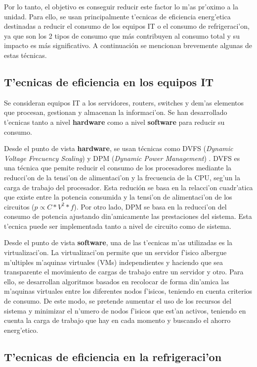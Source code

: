 	Por lo tanto, el objetivo es conseguir reducir este factor lo m'as pr'oximo a la unidad. Para ello, se usan principalmente t'ecnicas de eficiencia energ'etica destinadas a reducir el consumo de los equipos IT o el consumo de refrigeraci'on, ya que son los 2 tipos de consumo que más contribuyen al consumo total y su impacto es más significativo. A continuación se mencionan brevemente algunas de estas técnicas.

\subsection{T'ecnicas de eficiencia en los equipos IT}\label{sec:equiposIT}

	Se consideran equipos IT a los servidores, routers, switches y dem'as elementos que procesan, gestionan y almacenan la informaci'on. Se han desarrollado t'ecnicas tanto a nivel \textbf{hardware} como a nivel \textbf{software} \cite{ITEfficiency} para reducir su consumo. 

	Desde el punto de vista \textbf{hardware}, se usan técnicas como DVFS (\textit{Dynamic Voltage Frecuency Scaling}) \cite{DVFS} y DPM (\textit{Dynamic Power Management}) \cite{DPM}. DVFS es una técnica que pemite reducir el consumo de los procesadores mediante la reducci'on de la tensi'on de alimentaci'on y la frecuencia de la CPU, seg'un la carga de trabajo del procesador. Esta redución se basa en la relacci'on cuadr'atica que existe entre la potencia consumida y la tensi'on de alimentaci'on de los circuitos ($ p\propto C*V^{2}*f$). Por otro lado, DPM se basa en la reducci'on del consumo de potencia ajustando din'amicamente las prestaciones del sistema. Esta t'ecnica puede ser implementada tanto a nivel de circuito como de sistema.

	Desde el punto de vista \textbf{software}, una de las t'ecnicas m'as utilizadas es la virtualizaci'on. La virtualizaci'on permite  que un servidor f'isico albergue m'ultiples m'aquinas virtuales (VMs) independientes y haciendo que sea transparente el movimiento de cargas de trabajo entre un servidor y otro. Para ello, se desarrollan algoritmos \cite{VM} basados en recolocar de forma din'amica las m'aquinas virtuales entre los diferentes nodos f'isicos, teniendo en cuenta criterios de consumo. De este modo, se pretende aumentar el uso de los recursos del sistema y minimizar el n'umero de nodos f'isicos que est'an activos, teniendo en cuenta la carga de trabajo que hay en cada momento y buscando el ahorro energ'etico.

\subsection{T'ecnicas de eficiencia en la refrigeraci'on}\label{sec:refrigeracion}
 
